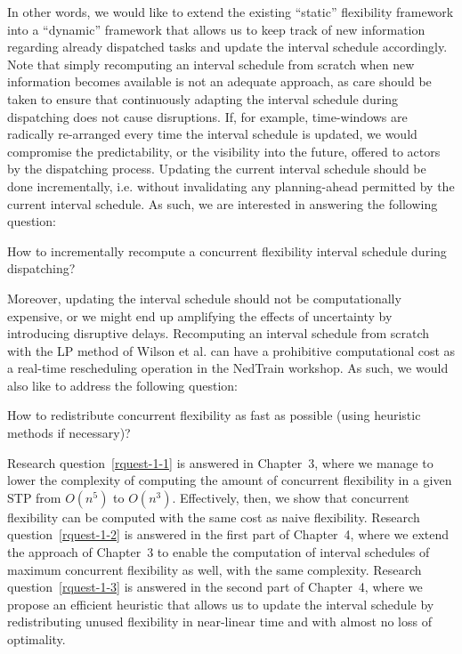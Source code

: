 	In other words, we would like to extend the existing ``static'' flexibility framework into a ``dynamic'' framework 
	that allows us to keep track of new information regarding already dispatched tasks and update the interval schedule accordingly.
	Note that simply recomputing an interval schedule from scratch when new information becomes available is not an adequate approach, 
	as care should be taken to ensure that continuously adapting the interval schedule during dispatching does not cause disruptions. 
	If, for example, time-windows are radically re-arranged every time the interval schedule is updated, we would compromise the predictability, 
	or the visibility into the future, offered to actors by the dispatching process. 
	Updating the current interval schedule should be done incrementally, 
	i.e. without invalidating any planning-ahead permitted by the current interval schedule. 
	As such, we are interested in answering the following question:

	\begin{rquest}
	\label{rquest-1-2}
	How to incrementally recompute a concurrent flexibility interval schedule during dispatching?
	\end{rquest}

	Moreover, updating the interval schedule should not be computationally expensive,
	or we might end up amplifying the effects of uncertainty by introducing disruptive delays.
	Recomputing an interval schedule from scratch with the LP method of Wilson et al. 
	can have a prohibitive computational cost as a real-time rescheduling operation in the NedTrain workshop.
	As such, we would also like to address the following question:

	\begin{rquest}
	\label{rquest-1-3}
	How to redistribute concurrent flexibility as fast as possible (using heuristic methods if necessary)?
	\end{rquest}

	Research question~\ref{rquest-1-1} is answered in Chapter~3,
	where we manage to lower the complexity of computing the amount of concurrent flexibility in a given STP from $O(n^5)$ to $O(n^3)$.
	Effectively, then, we show that concurrent flexibility can be computed with the same cost as naive flexibility.
	Research question~\ref{rquest-1-2} is answered in the first part of Chapter~4, 
	where we extend the approach of Chapter~3 to enable the computation of interval schedules of maximum concurrent flexibility as well, 
	with the same complexity.
	Research question~\ref{rquest-1-3} is answered in the second part of Chapter~4,
	where we propose an efficient heuristic that allows us to update the interval schedule by redistributing unused flexibility in near-linear time
	and with almost no loss of optimality. 
